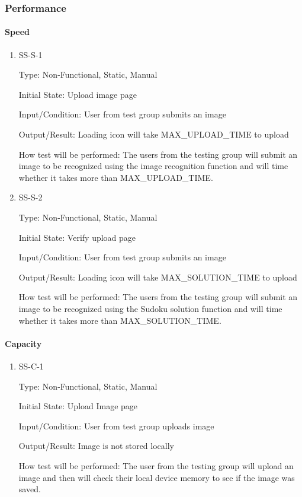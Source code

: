 \documentclass[11pt]{article}
\begin{document}
\subsubsection{Performance}

\paragraph{Speed}

\begin{enumerate}

\item{SS-S-1\\}

Type: Non-Functional, Static, Manual
					
Initial State: Upload image page
					
Input/Condition: User from test group submits an image
					
Output/Result: Loading icon will take MAX\_UPLOAD\_TIME to upload
					
How test will be performed: The users from the testing group will submit an image to be recognized using the image recognition function and will time whether it takes more than MAX\_UPLOAD\_TIME.
					
\item{SS-S-2\\}

Type: Non-Functional, Static, Manual
					
Initial State: Verify upload page
					
Input/Condition: User from test group submits an image
					
Output/Result: Loading icon will take MAX\_SOLUTION\_TIME to upload
					
How test will be performed: The users from the testing group will submit an image to be recognized using the Sudoku solution function and will time whether it takes more than MAX\_SOLUTION\_TIME.

\end{enumerate}

\paragraph{Capacity}

\begin{enumerate}

\item{SS-C-1\\}

Type: Non-Functional, Static, Manual
					
Initial State: Upload Image page
					
Input/Condition: User from test group uploads image
					
Output/Result: Image is not stored locally
					
How test will be performed: The user from the testing group will upload an image and then will check their local device memory to see if the image was saved.

\end{enumerate}
\end{document}
